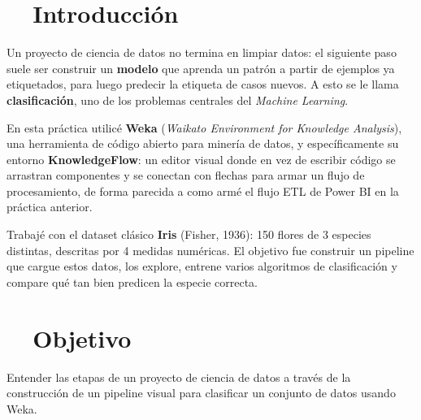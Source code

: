 \documentclass[11pt,a4paper]{article}
\begin{document}
\tableofcontents
\thispagestyle{fancy}
\newpage

\section{\faLightbulb\ \ Introducción}
Un proyecto de ciencia de datos no termina en limpiar datos: el siguiente paso suele ser construir un \textbf{modelo} que aprenda un patrón a partir de ejemplos ya etiquetados, para luego predecir la etiqueta de casos nuevos. A esto se le llama \textbf{clasificación}, uno de los problemas centrales del \textit{Machine Learning}.

En esta práctica utilicé \textbf{Weka} (\textit{Waikato Environment for Knowledge Analysis}), una herramienta de código abierto para minería de datos, y específicamente su entorno \textbf{KnowledgeFlow}: un editor visual donde en vez de escribir código se arrastran componentes y se conectan con flechas para armar un flujo de procesamiento, de forma parecida a como armé el flujo ETL de Power BI en la práctica anterior.

Trabajé con el dataset clásico \textbf{Iris} (Fisher, 1936): 150 flores de 3 especies distintas, descritas por 4 medidas numéricas. El objetivo fue construir un pipeline que cargue estos datos, los explore, entrene varios algoritmos de clasificación y compare qué tan bien predicen la especie correcta.

\section{\faBullseye\ \ Objetivo}
\begin{objetivobox}
Entender las etapas de un proyecto de ciencia de datos a través de la construcción de un pipeline visual para clasificar un conjunto de datos usando Weka.
\end{objetivobox}

\end{document}
